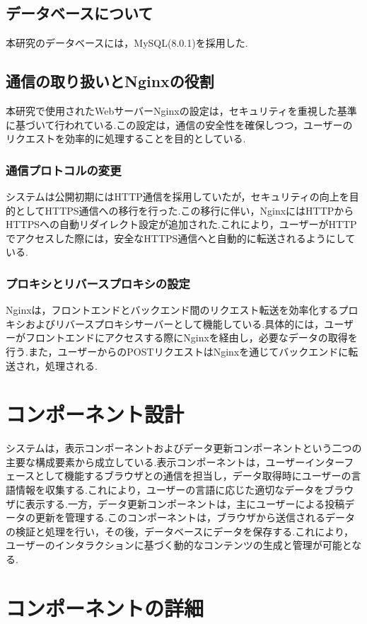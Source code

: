 \documentclass[b5paper,12pt,dvipdfmx]{jsreport}
\begin{document}
\subsection{データベースについて}
本研究のデータベースには，MySQL(8.0.1)を採用した.


\subsection{通信の取り扱いとNginxの役割}
本研究で使用されたWebサーバーNginxの設定は，セキュリティを重視した基準に基づいて行われている.この設定は，通信の安全性を確保しつつ，ユーザーのリクエストを効率的に処理することを目的としている.

\subsubsection{通信プロトコルの変更}
システムは公開初期にはHTTP通信を採用していたが，セキュリティの向上を目的としてHTTPS通信への移行を行った.この移行に伴い，NginxにはHTTPからHTTPSへの自動リダイレクト設定が追加された.これにより，ユーザーがHTTPでアクセスした際には，安全なHTTPS通信へと自動的に転送されるようにしている.

\subsubsection{プロキシとリバースプロキシの設定}
Nginxは，フロントエンドとバックエンド間のリクエスト転送を効率化するプロキシおよびリバースプロキシサーバーとして機能している.具体的には，ユーザーがフロントエンドにアクセスする際にNginxを経由し，必要なデータの取得を行う.また，ユーザーからのPOSTリクエストはNginxを通じてバックエンドに転送され，処理される.


\section{コンポーネント設計}
システムは，表示コンポーネントおよびデータ更新コンポーネントという二つの主要な構成要素から成立している.表示コンポーネントは，ユーザーインターフェースとして機能するブラウザとの通信を担当し，データ取得時にユーザーの言語情報を収集する.これにより，ユーザーの言語に応じた適切なデータをブラウザに表示する.一方，データ更新コンポーネントは，主にユーザーによる投稿データの更新を管理する.このコンポーネントは，ブラウザから送信されるデータの検証と処理を行い，その後，データベースにデータを保存する.これにより，ユーザーのインタラクションに基づく動的なコンテンツの生成と管理が可能となる.


\section{コンポーネントの詳細}
\end{document}
